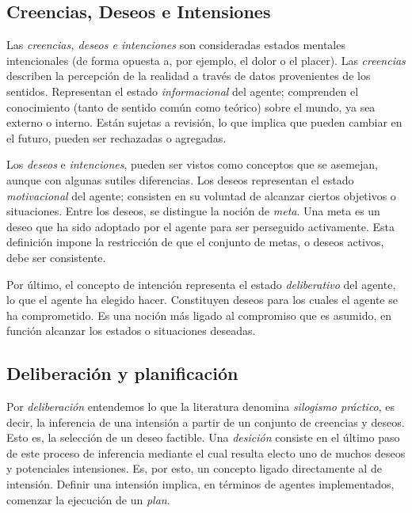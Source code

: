 \subsection{Creencias, Deseos e Intensiones}

Las \textit{creencias, deseos e intenciones} son consideradas estados mentales 
intencionales (de forma opuesta a, por ejemplo, el dolor o el placer). Las \textit{creencias} 
describen la percepción de la realidad a través de datos provenientes de 
los sentidos. Representan el estado \textit{informacional} del agente; comprenden
el conocimiento (tanto de sentido común como teórico) sobre el mundo, ya sea 
externo o interno. Están sujetas a revisión, lo que implica que pueden 
cambiar en el futuro, pueden ser rechazadas o agregadas. 

Los \textit{deseos} e \textit{intenciones}, pueden ser vistos como conceptos que 
se asemejan, aunque con algunas sutiles diferencias. Los deseos representan el 
estado \textit{motivacional} del agente; consisten en su voluntad de alcanzar 
ciertos objetivos o situaciones. Entre los deseos, se distingue la noción de 
\textit{meta}. Una meta es un deseo que ha sido adoptado por el agente para 
ser perseguido activamente. Esta definición impone la restricción de que el 
conjunto de metas, o deseos activos, debe ser consistente. 

Por último, el concepto de intención representa el estado \textit{deliberativo}
del agente, lo que el agente ha elegido hacer. Constituyen deseos para los cuales
el agente se ha comprometido. Es una noción más ligado al compromiso que es 
asumido, en función alcanzar los estados o situaciones deseadas. 

\subsection{Deliberación y planificación}

Por \textit{deliberación} entendemos lo que la literatura denomina \textit{silogismo práctico},
es decir, la inferencia de una intensión a partir de un conjunto de creencias y
deseos. Esto es, la selección de un deseo factible. Una \textit{desición} 
consiste en el último paso de este proceso de inferencia mediante el cual 
resulta electo uno de muchos deseos y potenciales intensiones. Es, por esto, un
concepto ligado directamente al de intensión. Definir una intensión implica, en 
términos de agentes implementados, comenzar la ejecución de un \textit{plan}.

